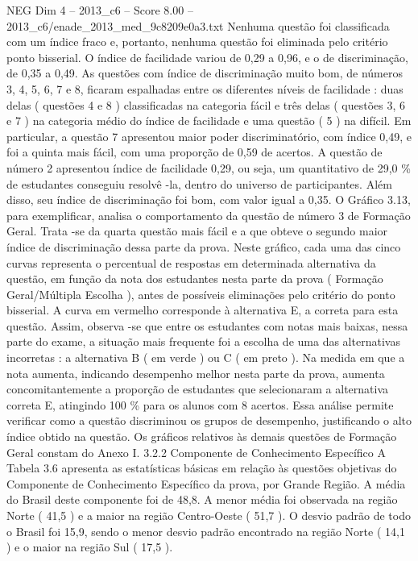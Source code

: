 \begin{textsample}{NEG Dim 4 – 2013\_c6 – Score 8.00 – 2013\_c6/enade\_2013\_med\_9c8209e0a3.txt}
Nenhuma questão foi classificada com um índice fraco e, portanto, nenhuma questão foi eliminada pelo critério ponto bisserial.
O índice de facilidade variou de 0,29 a 0,96, e o de discriminação, de 0,35 a 0,49.
As questões com índice de discriminação muito bom, de números 3, 4, 5, 6, 7 e 8, ficaram espalhadas entre os diferentes níveis de facilidade : duas delas ( questões 4 e 8 ) classificadas na categoria fácil e três delas ( questões 3, 6 e 7 ) na categoria médio do índice de facilidade e uma questão ( 5 ) na difícil.
Em particular, a questão 7 apresentou maior poder discriminatório, com índice 0,49, e foi a quinta mais fácil, com uma proporção de 0,59 de acertos.
A questão de número 2 apresentou índice de facilidade 0,29, ou seja, um quantitativo de 29,0 \% de estudantes conseguiu resolvê -la, dentro do universo de participantes.
Além disso, seu índice de discriminação foi bom, com valor igual a 0,35.
O Gráfico 3.13, para exemplificar, analisa o comportamento da questão de número 3 de Formação Geral.
Trata -se da quarta questão mais fácil e a que obteve o segundo maior índice de discriminação dessa parte da prova.
Neste gráfico, cada uma das cinco curvas representa o percentual de respostas em determinada alternativa da questão, em função da nota dos estudantes nesta parte da prova ( Formação Geral/Múltipla Escolha ), antes de possíveis eliminações pelo critério do ponto bisserial.
A curva em vermelho corresponde à alternativa E, a correta para esta questão.
Assim, observa -se que entre os estudantes com notas mais baixas, nessa parte do exame, a situação mais frequente foi a escolha de uma das alternativas incorretas : a alternativa B ( em verde ) ou C ( em preto ).
Na medida em que a nota aumenta, indicando desempenho melhor nesta parte da prova, aumenta concomitantemente a proporção de estudantes que selecionaram a alternativa correta E, atingindo 100 \% para os alunos com 8 acertos.
Essa análise permite verificar como a questão discriminou os grupos de desempenho, justificando o alto índice obtido na questão.
Os gráficos relativos às demais questões de Formação Geral constam do Anexo I. 3.2.2 Componente de Conhecimento Específico A Tabela 3.6 apresenta as estatísticas básicas em relação às questões objetivas do Componente de Conhecimento Específico da prova, por Grande Região.
A média do Brasil deste componente foi de 48,8.
A menor média foi observada na região Norte ( 41,5 ) e a maior na região Centro-Oeste ( 51,7 ).
O desvio padrão de todo o Brasil foi 15,9, sendo o menor desvio padrão encontrado na região Norte ( 14,1 ) e o maior na região Sul ( 17,5 ).

\end{textsample}

